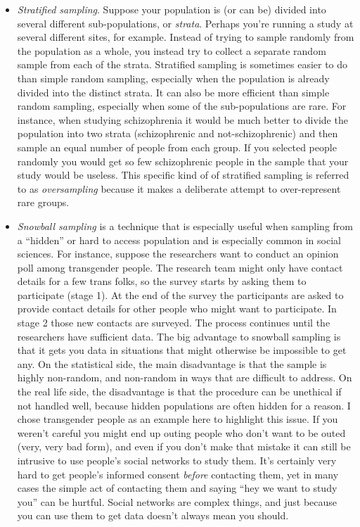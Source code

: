 \begin{itemize} 
\item {\it Stratified sampling}. Suppose your population is (or can be) divided into several different sub-populations, or {\it strata}. Perhaps you're running a study at several different sites, for example. Instead of trying to sample randomly from the population as a whole, you instead try to collect a separate random sample from each of the strata. Stratified sampling is sometimes easier to do than simple random sampling, especially when the population is already divided into the distinct strata. It can also be more efficient than simple random sampling, especially when some of the sub-populations are rare. For instance, when studying schizophrenia it would be much better to divide the population into two  strata (schizophrenic and not-schizophrenic) and then sample an equal number of people from each group. If you selected people randomly you would get so few schizophrenic people in the sample that your study would be useless. This specific kind of of stratified sampling is referred to as {\it oversampling} because it makes a deliberate attempt to over-represent rare groups. 
\item {\it Snowball sampling} is a technique that is especially useful when sampling from a ``hidden'' or hard to access population and is especially common in social sciences. For instance, suppose the researchers want to conduct an opinion poll among transgender people. The research team might only have contact details for a few trans folks, so the survey starts by asking them to participate (stage 1). At the end of the survey the participants are asked to provide contact details for other people who might want to participate. In stage 2 those new contacts are surveyed. The process continues until the researchers have sufficient data. The big advantage to snowball sampling is that it gets you data in situations that might otherwise be impossible to get any. On the statistical side, the main disadvantage is that the sample is highly non-random, and non-random in ways that are difficult to address. On the real life side, the disadvantage is that the procedure can be unethical if not handled well, because hidden populations are often hidden for a reason. I chose transgender people as an example here to highlight this issue. If you weren't careful you might end up outing people who don't want to be outed (very, very bad form), and even if you don't make that mistake it can still be intrusive to use people's social networks to study them. It's certainly very hard to get people's informed consent {\it before} contacting them, yet in many cases the simple act of contacting them and saying ``hey we want to study you'' can be hurtful. Social networks are complex things, and just because you can use them to get data doesn't always mean you should.

\end{itemize}
